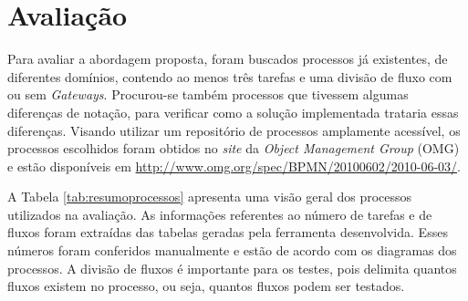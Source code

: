 \documentclass[12pt]{article}
\begin{document}




\section{Avaliação}\label{sec:avaliacao}
Para avaliar a abordagem proposta, foram buscados processos já existentes, de diferentes domínios, contendo ao menos três tarefas e uma divisão de fluxo com ou sem \emph{Gateways}. Procurou-se também processos que tivessem algumas diferenças de notação, para verificar como a solução implementada trataria essas diferenças. Visando utilizar um repositório de processos amplamente acessível, os processos escolhidos foram obtidos no \emph{site} da \emph{Object Management Group} (OMG) e estão disponíveis em \url{http://www.omg.org/spec/BPMN/20100602/2010-06-03/}.

A Tabela \ref{tab:resumoprocessos} apresenta uma visão geral dos processos utilizados na avaliação. As informações referentes ao número de tarefas e de fluxos foram extraídas das tabelas geradas pela ferramenta desenvolvida. Esses números foram conferidos manualmente e estão de acordo com os diagramas dos processos.  A divisão de fluxos é importante para os testes, pois delimita quantos fluxos existem no processo, ou seja, quantos fluxos podem ser testados.
\end{document}
